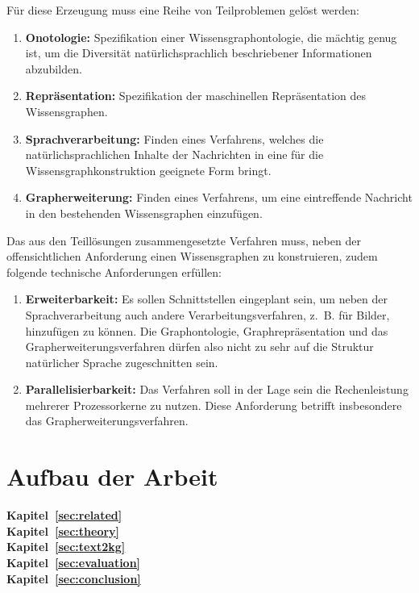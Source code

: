Für diese Erzeugung muss eine Reihe von Teilproblemen gelöst werden:
\begin{enumerate}
	\item \textbf{Onotologie:}
		Spezifikation einer Wissensgraphontologie, die mächtig genug ist, um die Diversität natürlichsprachlich beschriebener Informationen abzubilden.
	\item \textbf{Repräsentation:}
		Spezifikation der maschinellen Repräsentation des Wissensgraphen.
	\item \textbf{Sprachverarbeitung:}
		Finden eines Verfahrens, welches die natürlichsprachlichen Inhalte der Nachrichten in eine für die Wissensgraphkonstruktion geeignete Form bringt.
	\item \textbf{Grapherweiterung:}
		Finden eines Verfahrens, um eine eintreffende Nachricht in den bestehenden Wissensgraphen einzufügen.
\end{enumerate}

Das aus den Teillösungen zusammengesetzte Verfahren muss, neben der offensichtlichen Anforderung einen Wissensgraphen zu konstruieren, zudem folgende technische Anforderungen erfüllen:
\begin{enumerate}
	\item \textbf{Erweiterbarkeit:}
		Es sollen Schnittstellen eingeplant sein, um neben der Sprachverarbeitung auch andere Verarbeitungsverfahren, z.~B. für Bilder, hinzufügen zu können.
		Die Graphontologie, Graphrepräsentation und das Grapherweiterungsverfahren dürfen also nicht zu sehr auf die Struktur natürlicher Sprache zugeschnitten sein.
	\item \textbf{Parallelisierbarkeit:}
		Das Verfahren soll in der Lage sein die Rechenleistung mehrerer Prozessorkerne zu nutzen.
		Diese Anforderung betrifft insbesondere das Grapherweiterungsverfahren.
\end{enumerate}

\section{Aufbau der Arbeit}%
\label{sec:intro:structure}

\textbf{Kapitel~\ref{sec:related}} \\[0.2em]

\textbf{Kapitel~\ref{sec:theory}} \\[0.2em]

\textbf{Kapitel~\ref{sec:text2kg}} \\[0.2em]

\textbf{Kapitel~\ref{sec:evaluation}} \\[0.2em]

\textbf{Kapitel~\ref{sec:conclusion}} \\[0.2em]
